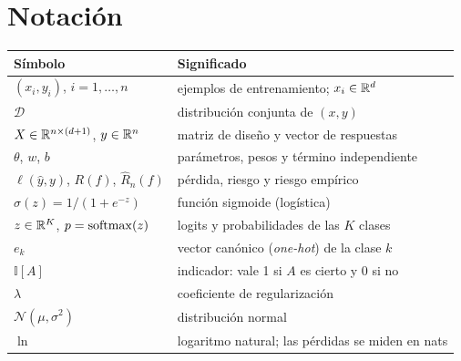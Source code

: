 \documentclass[11pt,a4paper,twoside,openany]{book}
\newcommand{\N}{\mathcal{N}}
\newcommand{\D}{\mathcal{D}}
\newcommand{\ind}{\mathbb{I}}
\newcommand{\Remp}{\widehat{R}_n}
\begin{document}
\section*{Notación}
\begin{center}
\begin{tabular}{@{}ll@{}}
\toprule
Símbolo & Significado \\
\midrule
$(x_i,y_i)$, $i=1,\dots,n$ & ejemplos de entrenamiento; $x_i\in\mathbb{R}^{d}$ \\
$\D$ & distribución conjunta de $(x,y)$ \\
$X\in\mathbb{R}^{n\times(d+1)}$, $y\in\mathbb{R}^{n}$ & matriz de diseño y vector de respuestas \\
$\theta$, $w$, $b$ & parámetros, pesos y término independiente \\
$\ell(\hat y,y)$, $R(f)$, $\Remp(f)$ & pérdida, riesgo y riesgo empírico \\
$\sigma(z)=1/(1+e^{-z})$ & función sigmoide (logística) \\
$z\in\mathbb{R}^{K}$, $p=\operatorname{softmax}(z)$ & logits y probabilidades de las $K$ clases \\
$e_k$ & vector canónico (\emph{one-hot}) de la clase $k$ \\
$\ind[A]$ & indicador: vale 1 si $A$ es cierto y 0 si no \\
$\lambda$ & coeficiente de regularización \\
$\N(\mu,\sigma^{2})$ & distribución normal \\
$\ln$ & logaritmo natural; las pérdidas se miden en nats \\
\bottomrule
\end{tabular}
\end{center}

\tableofcontents

\mainmatter







\appendix


\backmatter

\end{document}
